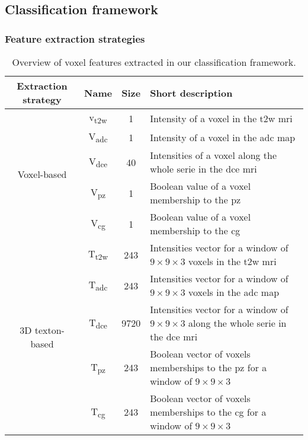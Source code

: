 \subsection{Classification framework}\label{subsec:classif}

\subsubsection{Feature extraction strategies}\label{subsubsec:featextr}

\begin{table}[h]
\caption{Overview of voxel features extracted in our classification framework.} 
\label{tab:feat}
\renewcommand{\arraystretch}{1.3}
\begin{center}       
\begin{tabular}{c|c|c|p{9cm}} %
\hline
Extraction strategy & Name & Size & Short description  \\
\hline
\hline
\multirow{5}{*}{Voxel-based} & v\textsubscript{\ac{t2w}} & 1 & Intensity of a voxel in the \ac{t2w} \ac{mri} \\
 & V\textsubscript{\ac{adc}} & 1 & Intensity of a voxel in the \ac{adc} map  \\
 & V\textsubscript{\ac{dce}} & 40 & Intensities of a voxel along the whole serie in the \ac{dce} \ac{mri}  \\
 & V\textsubscript{\ac{pz}} & 1 & Boolean value of a voxel membership to the \ac{pz} \\
 & V\textsubscript{\ac{cg}} & 1 & Boolean value of a voxel membership to the \ac{cg} \\ 
\hline
\hline
\multirow{5}{*}{3D texton-based} & T\textsubscript{\ac{t2w}} & 243 & Intensities vector for a window of $9 \times 9 \times 3$ voxels in the \ac{t2w} \ac{mri} \\
 & T\textsubscript{\ac{adc}} & 243 & Intensities vector for a window of $9 \times 9 \times 3$ voxels in the \ac{adc} map \\
 & T\textsubscript{\ac{dce}} & 9720 & Intensities vector for a window of $9 \times 9 \times 3$ along the whole serie in the \ac{dce} \ac{mri} \\
 & T\textsubscript{\ac{pz}} & 243 & Boolean vector of voxels memberships to the \ac{pz} for a window of $9 \times 9 \times 3$ \\
 & T\textsubscript{\ac{cg}} & 243 & Boolean vector of voxels memberships to the \ac{cg} for a window of $9 \times 9 \times 3$ \\
\hline 
\end{tabular}
\end{center}
\end{table}

